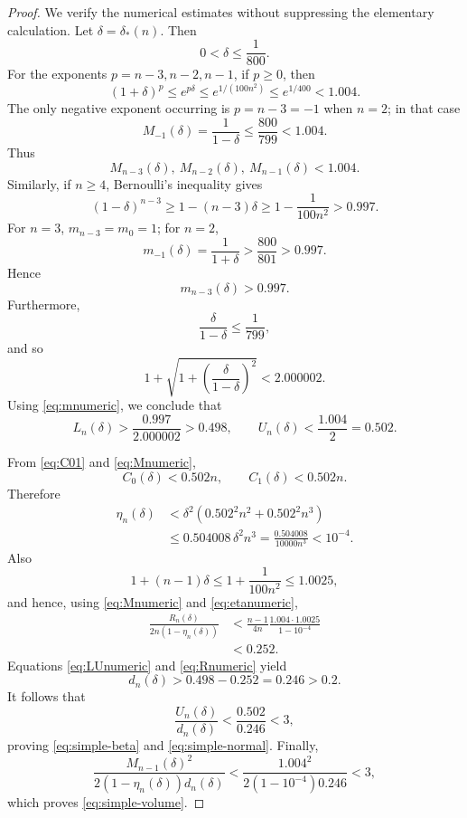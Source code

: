 \documentclass[11pt]{amsart}
\theoremstyle{definition}
\begin{document}
\begin{proof}
We verify the numerical estimates without suppressing the elementary
calculation.  Let \(\delta=\delta_*(n)\).  Then
\[
   0<\delta\le\frac1{800}.
\tag{3.43}\label{eq:delta-bound}
\]
For the exponents \(p=n-3,n-2,n-1\), if \(p\ge0\), then
\[
   (1+\delta)^p\le e^{p\delta}
   \le e^{1/(100n^2)}
   \le e^{1/400}<1.004.
\]
The only negative exponent occurring is \(p=n-3=-1\) when \(n=2\); in that
case
\[
   M_{-1}(\delta)=\frac1{1-\delta}
   \le\frac{800}{799}<1.004.
\]
Thus
\[
   M_{n-3}(\delta),\ M_{n-2}(\delta),\ M_{n-1}(\delta)<1.004.
\tag{3.44}\label{eq:Mnumeric}
\]
Similarly, if \(n\ge4\), Bernoulli's inequality gives
\[
   (1-\delta)^{n-3}\ge1-(n-3)\delta
   \ge1-\frac1{100n^2}>0.997.
\]
For \(n=3\), \(m_{n-3}=m_0=1\); for \(n=2\),
\[
   m_{-1}(\delta)=\frac1{1+\delta}>\frac{800}{801}>0.997.
\]
Hence
\[
   m_{n-3}(\delta)>0.997.
\tag{3.45}\label{eq:mnumeric}
\]
Furthermore,
\[
   \frac{\delta}{1-\delta}\le\frac1{799},
\]
and so
\[
   1+\sqrt{1+\left(\frac{\delta}{1-\delta}\right)^2}
   <2.000002.
\]
Using \eqref{eq:mnumeric}, we conclude that
\[
   L_n(\delta)>\frac{0.997}{2.000002}>0.498,
   \qquad
   U_n(\delta)<\frac{1.004}{2}=0.502.
\tag{3.46}\label{eq:LUnumeric}
\]

From \eqref{eq:C01} and \eqref{eq:Mnumeric},
\[
   C_0(\delta)<0.502n,\qquad C_1(\delta)<0.502n.
\]
Therefore
\[
\begin{aligned}
   \eta_n(\delta)
   &<\delta^2(0.502^2n^2+0.502^2n^3) \\
   &\le0.504008\,\delta^2n^3
    =\frac{0.504008}{10000n^3}
    <10^{-4}.
\end{aligned}
\tag{3.47}\label{eq:etanumeric}
\]
Also
\[
   1+(n-1)\delta
   \le1+\frac1{100n^2}
   \le1.0025,
\]
and hence, using \eqref{eq:Mnumeric} and \eqref{eq:etanumeric},
\[
\begin{aligned}
   \frac{R_n(\delta)}{2n(1-\eta_n(\delta))}
   &<
   \frac{n-1}{4n}
   \frac{1.004\cdot1.0025}{1-10^{-4}} \\
   &<0.252.
\end{aligned}
\tag{3.48}\label{eq:Rnumeric}
\]
Equations \eqref{eq:LUnumeric} and \eqref{eq:Rnumeric} yield
\[
   d_n(\delta)>0.498-0.252=0.246>0.2.
\tag{3.49}\label{eq:dnumeric}
\]
It follows that
\[
   \frac{U_n(\delta)}{d_n(\delta)}
   <\frac{0.502}{0.246}<3,
\]
proving \eqref{eq:simple-beta} and \eqref{eq:simple-normal}.
Finally,
\[
   \frac{M_{n-1}(\delta)^2}
        {2(1-\eta_n(\delta))d_n(\delta)}
   <
   \frac{1.004^2}{2(1-10^{-4})0.246}<3,
\]
which proves \eqref{eq:simple-volume}.
\end{proof}
\end{document}

